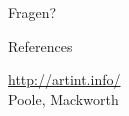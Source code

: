 \documentclass[10pt]{beamer}
\begin{document}
\begin{frame}[standout]
    Fragen?
\end{frame}

\appendix

\begin{frame}[allowframebreaks]{References}

    
    
    \url{http://artint.info/}\\
    Poole, Mackworth

\end{frame}
\end{document}
